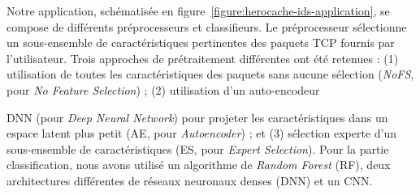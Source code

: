 Notre application, schématisée en figure~\ref{figure:herocache-ids-application}, se compose de différents préprocesseurs et classifieurs. Le préprocesseur sélectionne un sous-ensemble de caractéristiques pertinentes des paquets \gls{TCP} fournis par l'utilisateur. Trois approches de prétraitement différentes ont été retenues : (1) utilisation de toutes les caractéristiques des paquets sans aucune sélection (\textit{NoFS}, pour \textit{No Feature Selection}) ; (2) utilisation d'un auto-encodeur {\gls{DNN} (pour \textit{Deep Neural Network}) pour projeter les caractéristiques dans un espace latent plus petit (\gls{AE}, pour \textit{Autoencoder}) ; et (3) sélection experte d'un sous-ensemble de caractéristiques (\gls{ES}, pour \textit{Expert Selection}). Pour la partie classification, nous avons utilisé un algorithme de \textit{Random Forest} (\gls{RF}), deux architectures différentes de réseaux neuronaux denses (\gls{DNN}) et un \gls{CNN}.

}
